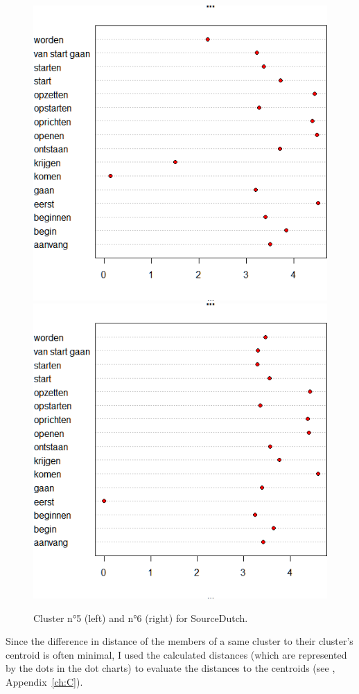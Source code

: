 \begin{figure}
\includegraphics[width=.48\textwidth,trim=0 15 0 25]{figures/Vandevoorde2-img60.png}\hfill%
\includegraphics[width=.48\textwidth,trim=0 15 0 25]{figures/Vandevoorde2-img61.png}
\caption{\label{fig:4:60}Cluster n°5 (left) and n°6 (right) for SourceDutch.\label{fig:4:61}}
\end{figure}


Since the difference in distance of the members of a same cluster to their cluster’s centroid is often minimal, I used the calculated distances (which are represented by the dots in the dot charts) to evaluate the distances to the centroids (see , Appendix~\ref{ch:C}).

